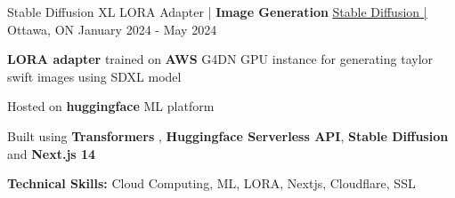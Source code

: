 \begin{cventries}

	\cventry
	{Stable Diffusion XL LORA Adapter | \textbf{Image Generation}}
	{\underline{\href{https://lefan.ca/silly-goose/image-gallery}{Stable Diffusion | \ExternalLink}}} %
	{Ottawa, ON} %
	{January 2024 - May 2024} %
	{
		\begin{cvitems} %
			\item {\textbf{LORA adapter} trained on \textbf{AWS} G4DN GPU instance for generating taylor swift images using SDXL model}
			\item {Hosted on \textbf{huggingface} ML platform}
			\item {Built using \textbf{Transformers} , \textbf{Huggingface Serverless API}, \textbf{Stable Diffusion} and \textbf{Next.js 14}}
			\item {\textbf{Technical Skills:} Cloud Computing, ML, LORA, Nextjs, Cloudflare, SSL}
		\end{cvitems}
	}


\end{cventries}

